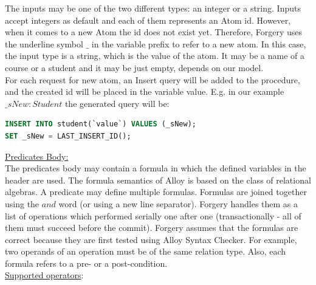 \documentclass[oneside]{book}
\begin{document}
\noindent The inputs may be one of the two different types: an integer or a string. Inputs accept integers as default and each of them represents an Atom id. However, when it comes to a new Atom the id does not exist yet. Therefore, Forgery uses the underline symbol $\_$ in the variable prefix to refer to a new atom. In this case, the input type is a string, which is the value of the atom. It may be a name of a course or a student and it may be just empty, depends on our model.\\

For each request for new atom, an Insert query will be added to the procedure, and the created id will be placed in the variable value. E.g. in our example $\_sNew : Student$ the generated query will be:
\begin{lstlisting}[escapechar=@,language=SQL]
INSERT INTO student(`value`) VALUES (_sNew);
SET _sNew = LAST_INSERT_ID();
\end{lstlisting}

\noindent\underline{Predicates Body:}\\

\noindent The predicates body may contain a formula in which the defined variables in the header are used. 
The formula semantics of Alloy is based on the class of relational algebras. A predicate may define multiple formulas. Formulas are joined together using the $and$ word (or using a new line separator). Forgery handles them as a list of operations which performed serially one after one (transactionally - all of them must succeed before the commit). Forgery assumes that the formulas are correct because they are first tested using Alloy Syntax Checker. For example, two operands of an operation must be of the same relation type. Also, each formula refers to a pre- or a post-condition.\\

\noindent\underline{Supported operators}:
\end{document}
